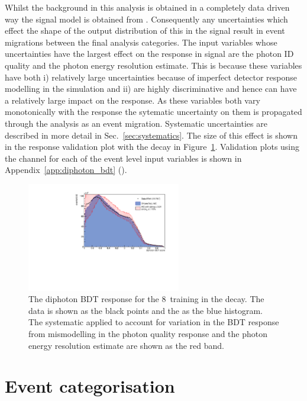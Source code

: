 Whilst the background in this analysis is obtained in a completely data driven way the signal model is obtained from \MC. Consequently any uncertainties which effect the shape of the output distribution of this \BDT in the signal result in event migrations between the final analysis categories. The input variables whose uncertainties have the largest effect on the \BDT response in signal are the photon ID quality and the photon energy resolution estimate. This is because these variables have both i) relatively large uncertainties because of imperfect detector response modelling in the simulation and ii) are highly discriminative and hence can have a relatively large impact on the \BDT response. As these variables both vary monotonically with the \BDT response the sytematic uncertainty on them is propagated through the analysis as an event migration. Systematic uncertainties are described in more detail in Sec.~\ref{sec:systematics}. The size of this effect is shown in the \BDT response validation plot with the \Zee decay in Figure~\ref{fig:diphotonBDT_zee}. Validation plots using the \Zee channel for each of the event level \BDT input variables is shown in Appendix~\ref{app:diphoton_bdt} ().

\begin{figure}
  \includegraphics[width=0.6\textwidth]{selec_and_cats/plots/diphoBDT_8TeV_zee.pdf}
  \caption{The diphoton BDT response for the 8~\TeV training in the \Zee decay. The data is shown as the black points and the \MC as the blue histogram. The systematic applied to account for variation in the BDT response from mismodelling in the photon quality response and the photon energy resolution estimate are shown as the red band. }
  \label{fig:diphotonBDT_zee}
\end{figure}

\section{Event categorisation}
\label{sec:categorisation}

